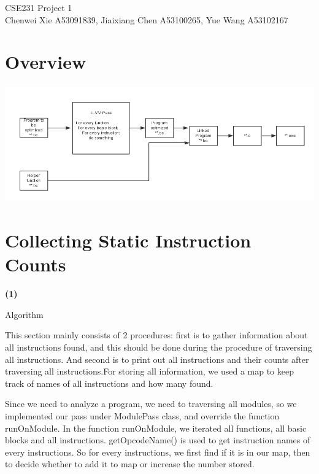 \documentclass{article}
\renewcommand{\part}[1] {\vspace{.10in} {\bf (#1)}}
\newcommand{\myname}{Chenwei Xie A53091839,  Jiaixiang Chen A53100265, Yue Wang A53102167}
\begin{document}
\thispagestyle{plain}
\begin{center}                  %
{\Large CSE231 Project 1 } \\
\myname \\
\end{center}

\section{Overview}

\includegraphics[height=5cm]{graph.png}\\

\section{Collecting Static Instruction Counts}

\part{1}

Algorithm
	

This section mainly consists of 2 procedures: first is to gather information about all instructions found, and this should be done during the procedure of traversing all instructions. And second is to print out all instructions and their counts after traversing all instructions.For storing all information, we used a map to keep track of names of all instructions and how many found.

Since we need to analyze a program, we need to traversing all modules, so we implemented our pass under ModulePass class, and override the function runOnModule. In the function runOnModule, we iterated all functions, all basic blocks and all instructions. getOpcodeName() is used to get instruction names of every instructions. So for every instructions, we first find if it is in our map, then to decide whether to add it to map or increase the number stored.
	
\end{document}
